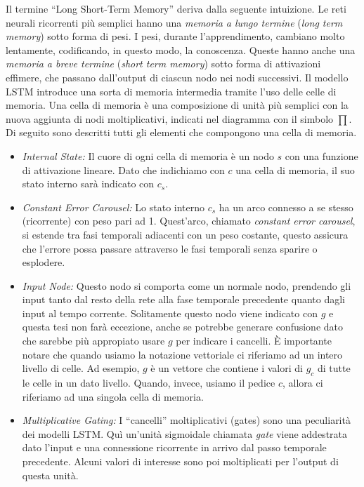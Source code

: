 Il termine ``Long Short-Term Memory'' deriva dalla seguente intuizione.
Le reti neurali ricorrenti pi\`u semplici hanno una \emph{memoria a lungo termine} (\emph{long term memory}) sotto forma di pesi.
I pesi, durante l'apprendimento, cambiano molto lentamente, codificando, in questo modo, la conoscenza.
Queste hanno anche una \emph{memoria a breve termine} (\emph{short term memory}) sotto forma di attivazioni effimere, che passano dall'output di ciascun nodo nei nodi successivi.
Il modello LSTM introduce una sorta di memoria intermedia tramite l'uso delle celle di memoria.
Una cella di memoria \`e una composizione di unit\`a pi\`u semplici con la nuova aggiunta di nodi moltiplicativi, indicati nel diagramma con il simbolo $\prod$.
Di seguito sono descritti tutti gli elementi che compongono una cella di memoria.
\begin{itemize}
  \item \emph{Internal State:} Il cuore di ogni cella di memoria \`e un nodo $s$ con una funzione di attivazione lineare.
  Dato che indichiamo con $c$ una cella di memoria, il suo stato interno sar\`a indicato con $c_s$.
  \item \emph{Constant Error Carousel:} Lo stato interno $c_s$ ha un arco connesso a se stesso (ricorrente) con peso pari ad 1.
  Quest'arco, chiamato \emph{constant error carousel}, si estende tra fasi temporali adiacenti con un peso costante, questo assicura che l'errore possa passare attraverso le fasi temporali senza sparire o esplodere.
  \item \emph{Input Node:} Questo nodo si comporta come un normale nodo, prendendo gli input tanto dal resto della rete alla fase temporale precedente quanto dagli input al tempo corrente.
  Solitamente questo nodo viene indicato con $g$ e questa tesi non far\`a eccezione, anche se potrebbe generare confusione dato che sarebbe pi\`u appropiato usare $g$ per indicare i cancelli.
  \`E importante notare che quando usiamo la notazione vettoriale ci riferiamo ad un intero livello di celle.
  Ad esempio, $g$ \`e un vettore che contiene i valori di $g_c$ di tutte le celle in un dato livello.
  Quando, invece, usiamo il pedice $c$, allora ci riferiamo ad una singola cella di memoria.
  \item \emph{Multiplicative Gating:} I ``cancelli'' moltiplicativi (gates) sono una peculiarit\`a dei modelli LSTM.
  Qu\`i un'unit\`a sigmoidale chiamata \emph{gate} viene addestrata dato l'input e una connessione ricorrente in arrivo dal passo temporale precedente.
  Alcuni valori di interesse sono poi moltiplicati per l'output di questa unit\`a.

\end{itemize}
